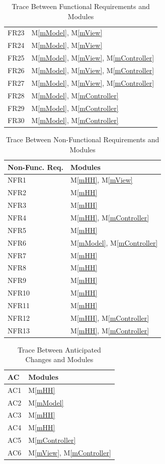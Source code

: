 \documentclass[12pt, titlepage]{article}
\newcommand{\mref}[1]{M\ref{#1}}
\begin{document}
\begin{table}[H]
\begin{tabular}{p{} p{}}
FR23 & \mref{mModel}, \mref{mView}\\
FR24 & \mref{mModel}, \mref{mView}\\
FR25 & \mref{mModel}, \mref{mView}, \mref{mController}\\
FR26 & \mref{mModel}, \mref{mView}, \mref{mController}\\
FR27 & \mref{mModel}, \mref{mView}, \mref{mController}\\
FR28 & \mref{mModel}, \mref{mController}\\
FR29 & \mref{mModel}, \mref{mController}\\
FR30 & \mref{mModel}, \mref{mController}\\
\bottomrule
\end{tabular}
\caption{Trace Between Functional Requirements and Modules}
\label{TblRT}
\end{table}

\begin{table}[H]
\centering
\begin{tabular}{p{} p{}}
\toprule
\textbf{Non-Func. Req.} & \textbf{Modules}\\
\midrule
NFR1 & \mref{mHH}, \mref{mView}\\
NFR2 & \mref{mHH}\\
NFR3 & \mref{mHH}\\
NFR4 & \mref{mHH}, \mref{mController}\\
NFR5 & \mref{mHH}\\
NFR6 & \mref{mModel}, \mref{mController}\\
NFR7 & \mref{mHH}\\
NFR8 & \mref{mHH}\\
NFR9 & \mref{mHH}\\
NFR10 & \mref{mHH}\\
NFR11 & \mref{mHH}\\
NFR12 & \mref{mHH}, \mref{mController}\\
NFR13 & \mref{mHH}, \mref{mController}\\
\bottomrule
\end{tabular}
\caption{Trace Between Non-Functional Requirements and Modules}
\label{TblRT}
\end{table}

\begin{table}[H]
\centering
\begin{tabular}{p{} p{}}
\toprule
\textbf{AC} & \textbf{Modules}\\
\midrule
AC1 & \mref{mHH}\\
AC2 & \mref{mModel}\\
AC3 & \mref{mHH}\\
AC4 & \mref{mHH}\\
AC5 & \mref{mController}\\
AC6 & \mref{mView}, \mref{mController}\\
\bottomrule
\end{tabular}
\caption{Trace Between Anticipated Changes and Modules}
\label{TblACT}
\end{table}
\end{document}
